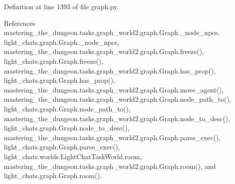 Definition at line 1393 of file graph.\+py.



References mastering\+\_\+the\+\_\+dungeon.\+tasks.\+graph\+\_\+world2.\+graph.\+Graph.\+\_\+node\+\_\+npcs, light\+\_\+chats.\+graph.\+Graph.\+\_\+node\+\_\+npcs, mastering\+\_\+the\+\_\+dungeon.\+tasks.\+graph\+\_\+world2.\+graph.\+Graph.\+freeze(), light\+\_\+chats.\+graph.\+Graph.\+freeze(), mastering\+\_\+the\+\_\+dungeon.\+tasks.\+graph\+\_\+world2.\+graph.\+Graph.\+has\+\_\+prop(), light\+\_\+chats.\+graph.\+Graph.\+has\+\_\+prop(), mastering\+\_\+the\+\_\+dungeon.\+tasks.\+graph\+\_\+world2.\+graph.\+Graph.\+move\+\_\+agent(), mastering\+\_\+the\+\_\+dungeon.\+tasks.\+graph\+\_\+world2.\+graph.\+Graph.\+node\+\_\+path\+\_\+to(), light\+\_\+chats.\+graph.\+Graph.\+node\+\_\+path\+\_\+to(), mastering\+\_\+the\+\_\+dungeon.\+tasks.\+graph\+\_\+world2.\+graph.\+Graph.\+node\+\_\+to\+\_\+desc(), light\+\_\+chats.\+graph.\+Graph.\+node\+\_\+to\+\_\+desc(), mastering\+\_\+the\+\_\+dungeon.\+tasks.\+graph\+\_\+world2.\+graph.\+Graph.\+parse\+\_\+exec(), light\+\_\+chats.\+graph.\+Graph.\+parse\+\_\+exec(), light\+\_\+chats.\+worlds.\+Light\+Chat\+Task\+World.\+room, mastering\+\_\+the\+\_\+dungeon.\+tasks.\+graph\+\_\+world2.\+graph.\+Graph.\+room(), and light\+\_\+chats.\+graph.\+Graph.\+room().

